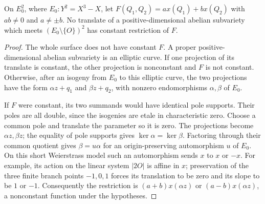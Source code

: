 \documentclass[11pt,a4paper]{article}
\begin{document}
\begin{lemma}\label{lem:fibers}
On $E_0^2$, where $E_0:Y^2=X^3-X$, let
$F(Q_1,Q_2)=a x(Q_1)+b x(Q_2)$ with $ab\ne0$ and $a\ne\pm b$.
No translate of a positive-dimensional abelian subvariety which meets
$(E_0\setminus\{O\})^2$ has constant restriction of $F$.
\end{lemma}
\begin{proof}
The whole surface does not have constant $F$. A proper
positive-dimensional abelian subvariety is an elliptic curve. If one
projection of its translate is constant, the other projection is
nonconstant and $F$ is not constant. Otherwise, after an isogeny from
$E_0$ to this elliptic curve, the two projections have the form
$\alpha z+q_1$ and $\beta z+q_2$, with nonzero endomorphisms
$\alpha,\beta$ of $E_0$.

If $F$ were constant, its two summands would have identical pole
supports. Their poles are all double, since the isogenies are etale
in characteristic zero. Choose a common pole and translate the
parameter so it is zero. The projections become $\alpha z,\beta z$;
the equality of pole supports gives $\ker\alpha=\ker\beta$. Factoring
through their common quotient gives $\beta=u\alpha$ for an
origin-preserving automorphism $u$ of $E_0$. On this short
Weierstrass model such an automorphism sends $x$ to $x$ or $-x$.
For example, its action on the linear system $|2O|$ is affine in $x$;
preservation of the three finite branch points $-1,0,1$ forces its
translation to be zero and its slope to be $1$ or $-1$.
Consequently the restriction is $(a+b)x(\alpha z)$ or
$(a-b)x(\alpha z)$, a nonconstant function under the hypotheses.
\end{proof}
\end{document}
